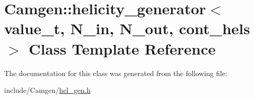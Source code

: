 \hypertarget{a00266}{\section{Camgen\-:\-:helicity\-\_\-generator$<$ value\-\_\-t, N\-\_\-in, N\-\_\-out, cont\-\_\-hels $>$ Class Template Reference}
\label{a00266}
}


The documentation for this class was generated from the following file\-:\begin{DoxyCompactItemize}
\item 
include/\-Camgen/\hyperlink{a00639}{hel\-\_\-gen.\-h}\end{DoxyCompactItemize}
